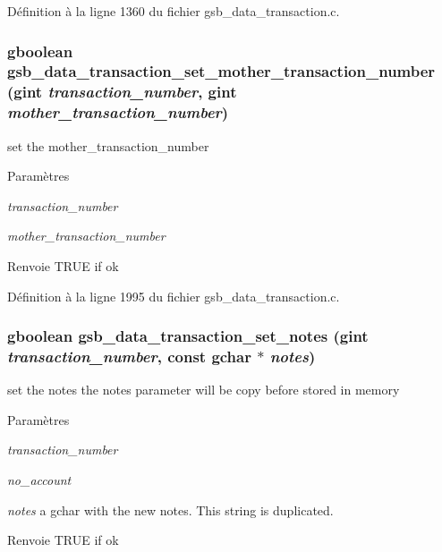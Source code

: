 Définition à la ligne 1360 du fichier gsb\_\-data\_\-transaction.c.

\subsubsection[{gsb\_\-data\_\-transaction\_\-set\_\-mother\_\-transaction\_\-number}]{\setlength{\rightskip}{0pt plus 5cm}gboolean gsb\_\-data\_\-transaction\_\-set\_\-mother\_\-transaction\_\-number (gint {\em transaction\_\-number}, \/  gint {\em mother\_\-transaction\_\-number})}\label{gsb__data__transaction_8c_abfffebad5a6949bd032c09311e3f995e}
set the mother\_\-transaction\_\-number


\begin{DoxyParams}{Paramètres}
\item[{\em transaction\_\-number}]\item[{\em mother\_\-transaction\_\-number}]\end{DoxyParams}
\begin{DoxyReturn}{Renvoie}
TRUE if ok 
\end{DoxyReturn}


Définition à la ligne 1995 du fichier gsb\_\-data\_\-transaction.c.

\subsubsection[{gsb\_\-data\_\-transaction\_\-set\_\-notes}]{\setlength{\rightskip}{0pt plus 5cm}gboolean gsb\_\-data\_\-transaction\_\-set\_\-notes (gint {\em transaction\_\-number}, \/  const gchar $\ast$ {\em notes})}\label{gsb__data__transaction_8c_ab503c0949e0aff8438156f760e20f85e}
set the notes the notes parameter will be copy before stored in memory 
\begin{DoxyParams}{Paramètres}
\item[{\em transaction\_\-number}]\item[{\em no\_\-account}]\item[{\em notes}]a gchar with the new notes. This string is duplicated. \end{DoxyParams}
\begin{DoxyReturn}{Renvoie}
TRUE if ok 
\end{DoxyReturn}



